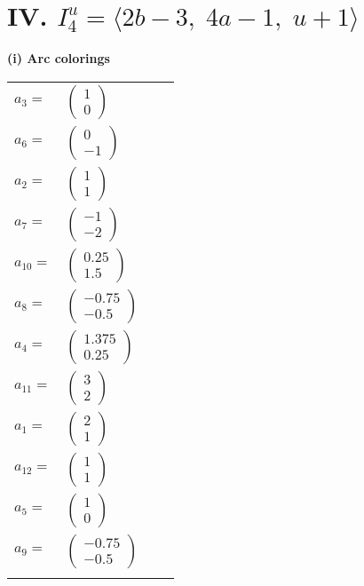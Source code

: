 \documentclass[1p]{elsarticle_modified}
\theoremstyle{definition}
\begin{document}
\centering \section*{IV. $I^u_{4}= \langle 2 b-3,\;4 a-1,\;u+1 \rangle$}
\flushleft \textbf{(i) Arc colorings}\\
\begin{tabular}{m{7pt} m{180pt} m{7pt} m{180pt} }
\flushright $a_{3}=$&$\begin{pmatrix}1\\0\end{pmatrix}$ \\
\flushright $a_{6}=$&$\begin{pmatrix}0\\-1\end{pmatrix}$ \\
\flushright $a_{2}=$&$\begin{pmatrix}1\\1\end{pmatrix}$ \\
\flushright $a_{7}=$&$\begin{pmatrix}-1\\-2\end{pmatrix}$ \\
\flushright $a_{10}=$&$\begin{pmatrix}0.25\\1.5\end{pmatrix}$ \\
\flushright $a_{8}=$&$\begin{pmatrix}-0.75\\-0.5\end{pmatrix}$ \\
\flushright $a_{4}=$&$\begin{pmatrix}1.375\\0.25\end{pmatrix}$ \\
\flushright $a_{11}=$&$\begin{pmatrix}3\\2\end{pmatrix}$ \\
\flushright $a_{1}=$&$\begin{pmatrix}2\\1\end{pmatrix}$ \\
\flushright $a_{12}=$&$\begin{pmatrix}1\\1\end{pmatrix}$ \\
\flushright $a_{5}=$&$\begin{pmatrix}1\\0\end{pmatrix}$ \\
\flushright $a_{9}=$&$\begin{pmatrix}-0.75\\-0.5\end{pmatrix}$\\&\end{tabular}
\end{document}
